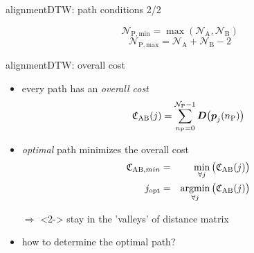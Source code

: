         \begin{frame}{alignment}{DTW: path conditions 2/2}
                \begin{figure}
                    
                \end{figure}
                \pause
                    \begin{equation*}
                        \mathcal{N}_\mathrm{P, min} = \max(\mathcal{N}_\mathrm{A}, \mathcal{N}_\mathrm{B})
                    \end{equation*}
                    \begin{equation*}
                        \mathcal{N}_\mathrm{P, max} = \mathcal{N}_\mathrm{A} + \mathcal{N}_\mathrm{B} - 2
                    \end{equation*}
        \end{frame}
        \begin{frame}{alignment}{DTW: overall cost}
            \begin{itemize}
                \item	every path has an \textit{overall cost}
                    \begin{equation*}
                        \mathfrak{C}_{\mathrm{AB}}(j) = \sum\limits_{n_\mathrm{P}= 0}^{\mathcal{N}_{\mathrm{P}}-1}{\mat{D}\big(\vec{P}_j(n_\mathrm{P})\big)} 
                    \end{equation*}
                \item<2->	\textit{optimal} path minimizes the overall cost
                    \begin{eqnarray*}
                        \mathfrak{C}_{\mathrm{AB},min} &=& \min\limits_{\forall j}\big(\mathfrak{C}_{\mathrm{AB}}(j)\big) \\
                        j_\mathrm{opt} 				&=& \operatorname*{argmin}\limits_{\forall j}\big(\mathfrak{C}_{\mathrm{AB}}(j)\big) 
                    \end{eqnarray*}
                \item[$\Rightarrow$]<2-> stay in the 'valleys' of distance matrix
                \item<3->	how to determine the optimal path?
            \end{itemize}
        \end{frame}
